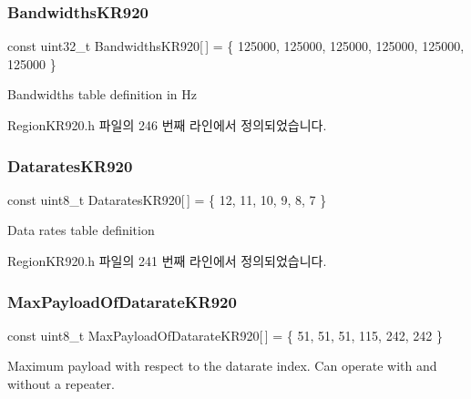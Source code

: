 \subsubsection{\texorpdfstring{Bandwidths\+K\+R920}{BandwidthsKR920}}
{\footnotesize\ttfamily const uint32\+\_\+t Bandwidths\+K\+R920\mbox{[}$\,$\mbox{]} = \{ 125000, 125000, 125000, 125000, 125000, 125000 \}\hspace{0.3cm}{\ttfamily [static]}}

Bandwidths table definition in Hz 

Region\+K\+R920.\+h 파일의 246 번째 라인에서 정의되었습니다.

\mbox{\label{group___r_e_g_i_o_n_k_r920_gad80bddd73920e3855ac0568c7e3fdbff}} 
\subsubsection{\texorpdfstring{Datarates\+K\+R920}{DataratesKR920}}
{\footnotesize\ttfamily const uint8\+\_\+t Datarates\+K\+R920\mbox{[}$\,$\mbox{]} = \{ 12, 11, 10, 9, 8, 7 \}\hspace{0.3cm}{\ttfamily [static]}}

Data rates table definition 

Region\+K\+R920.\+h 파일의 241 번째 라인에서 정의되었습니다.

\mbox{\label{group___r_e_g_i_o_n_k_r920_ga440b303161bd0b85c9c31af0a28904ed}} 
\subsubsection{\texorpdfstring{Max\+Payload\+Of\+Datarate\+K\+R920}{MaxPayloadOfDatarateKR920}}
{\footnotesize\ttfamily const uint8\+\_\+t Max\+Payload\+Of\+Datarate\+K\+R920\mbox{[}$\,$\mbox{]} = \{ 51, 51, 51, 115, 242, 242 \}\hspace{0.3cm}{\ttfamily [static]}}

Maximum payload with respect to the datarate index. Can operate with and without a repeater. 

